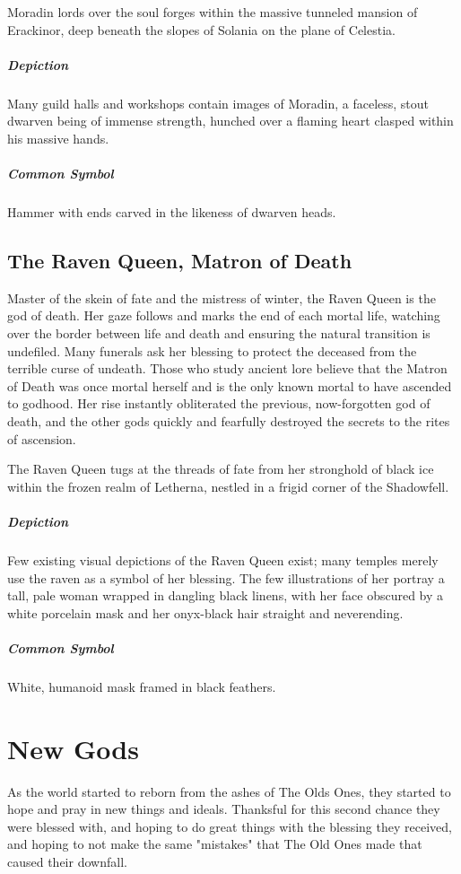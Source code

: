 \documentclass[letterpaper,twocolumn,openany,nodeprecatedcode]{dndbook}
\begin{document}
Moradin lords over the soul forges within the massive tunneled mansion of Erackinor,
deep beneath the slopes of Solania on the plane of Celestia.

\subparagraph{Depiction}
Many guild halls and workshops contain images of Moradin, a faceless, stout dwarven
being of immense strength, hunched over a flaming heart clasped within his massive hands.

\subparagraph{Common Symbol}
Hammer with ends carved in the likeness of dwarven heads.

\subsection{The Raven Queen, Matron of Death}

Master of the skein of fate and the mistress of winter, the Raven Queen is the god of
death. Her gaze follows and marks the end of each mortal life, watching over the border
between life and death and ensuring the natural transition is undefiled. Many funerals
ask her blessing to protect the deceased from the terrible curse of undeath. Those who
study ancient lore believe that the Matron of Death was once mortal herself and is the
only known mortal to have ascended to godhood. Her rise instantly obliterated the previous,
now-forgotten god of death, and the other gods quickly and fearfully destroyed the secrets
to the rites of ascension.

The Raven Queen tugs at the threads of fate from her stronghold of black ice within the
frozen realm of Letherna, nestled in a frigid corner of the Shadowfell.

\subparagraph{Depiction}
Few existing visual depictions of the Raven Queen exist; many temples merely use the
raven as a symbol of her blessing. The few illustrations of her portray a tall, pale
woman wrapped in dangling black linens, with her face obscured by a white porcelain
mask and her onyx-black hair straight and neverending.

\subparagraph{Common Symbol}
White, humanoid mask framed in black feathers.

\section{New Gods}

As the world started to reborn from the ashes of The Olds Ones, they started to hope and
pray in new things and ideals. Thanksful for this second chance they were blessed with,
and hoping to do great things with the blessing they received, and hoping to not make
the same "mistakes" that The Old Ones made that caused their downfall.
\end{document}
